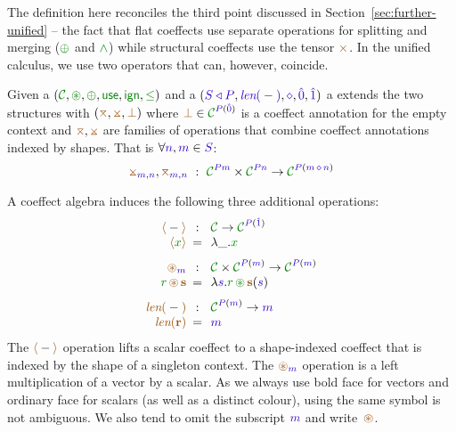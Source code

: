 The definition here reconciles the third point discussed in Section~\ref{sec:further-unified} --
the fact that flat coeffects use separate operations for splitting and merging ($\cpar$ and $\czip$)
while structural coeffects use the tensor $\atimes$. In the unified calculus, we use two operators
that can, however, coincide.

\begin{definition}
Given a  $(\C, \cseq, \cpar, \cunit, \czero, \cleq)$ and a
 $(\SHP, \slen{-}, \stimes, \sempty, \sunit)$ a \emph{} extends the two structures with $(\azip, \apar, \azero)$ where $\azero \in \C^{\SP(\sempty)}$
is a coeffect annotation for the empty context and $\azip, \apar$ are families of operations that
combine coeffect annotations indexed by shapes. That is $\forall \sclrd{n},\sclrd{m} \in \SH$:
%
\begin{equation*}
\apar_{\sclrd{m},\sclrd{n}}, \azip_{\sclrd{m},\sclrd{n}} ~:~ \C^{\SP \sclrd{m}} \times \C^{\SP \sclrd{n}} \rightarrow \C^{\SP (\sclrd{m}\,\stimes\,\sclrd{n})}
\end{equation*}
\end{definition}

\noindent
A coeffect algebra induces the following three additional operations:
%
\begin{equation*}
\begin{array}{rclcrcl}
 \alift{-} &\narrow{:}& \C \rightarrow \C^{\SP(\sunit)}  \\
 \alift{\cclrd{x}} &\narrow{=}& \lambda \_ . \cclrd{x}   \\
\\[-0.5em]
 \aseq_{\sclrd{m}} &\narrow{:}&  \C \times \C^{\SP(\sclrd{m})} \rightarrow \C^{\SP(\sclrd{m})}   \\
 \cclrd{r}\, \aseq\, \aclrd{\textbf{s}} &\narrow{=}& \lambda \sclrd{s} . \cclrd{r}\, \cseq\, \aclrd{\textbf{s}}(\sclrd{s}) \\
\\[-0.5em]
 \alen{-} &\narrow{:}& \C^{\SP(\sclrd{m})} \rightarrow \sclrd{m}\\
 \alen{\aclrd{\textbf{r}}} &\narrow{=}& \sclrd{m}
\end{array}
\end{equation*}
%
The $\alift{-}$ operation lifts a scalar coeffect to a shape-indexed coeffect that is indexed by
the shape of a singleton context. The $\aseq_{\sclrd{m}}$ operation is a left multiplication of a
vector by a scalar. As we always use bold face for vectors and ordinary face for scalars (as well
as a distinct colour), using the same symbol is not ambiguous. We also tend to omit the subscript
$\sclrd{m}$ and write~$\aseq$.

